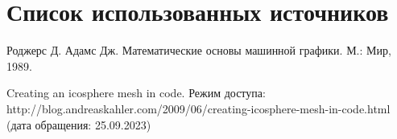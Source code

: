 \chapter*{Список использованных источников}


\begin{enumerate}[label = {[\arabic*]}]
	\item Роджерс Д. Адамс Дж. Математические основы машинной графики. М.: Мир, 1989.
	\item Creating an icosphere mesh in code. Режим доступа: http://blog.andreaskahler.com/2009/06/creating-icosphere-mesh-in-code.html (дата обращения: 25.09.2023)
\end{enumerate}